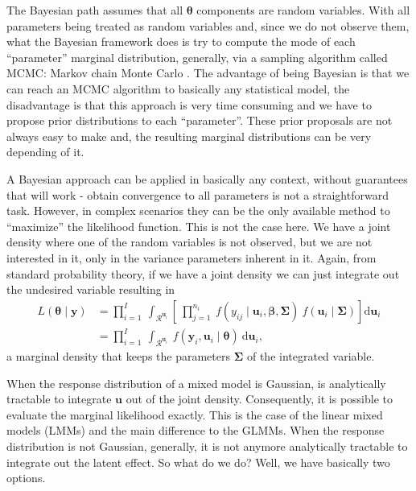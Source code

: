The Bayesian path assumes that all \(\bm{\theta}\) components are random
variables. With all parameters being treated as random variables and,
since we do not observe them, what the Bayesian framework does is try to
compute the mode of each ``parameter'' marginal distribution, generally,
via a sampling algorithm called MCMC: Markov chain Monte Carlo
\cite{MCMC, Diaconis}. The advantage of being Bayesian is that we can
reach an MCMC algorithm to basically any statistical model, the
disadvantage is that this approach is very time consuming and we have to
propose prior distributions to each ``parameter''. These prior proposals
are not always easy to make and, the resulting marginal distributions
can be very depending of it.

A Bayesian approach can be applied in basically any context, without
guarantees that will work - obtain convergence to all parameters is not
a straightforward task. However, in complex scenarios they can be the
only available method to ``maximize'' the likelihood function. This is
not the case here. We have a joint density where one of the random
variables is not observed, but we are not interested in it, only in the
variance parameters inherent in it. Again, from standard probability
theory, if we have a joint density we can just integrate out the
undesired variable resulting in
\begin{equation}
  \begin{aligned}
    L(\bm{\theta} \mid \mathbf{y}) &=
    \prod_{i=1}^{I}~\int_{\mathcal{R}^{\mathbf{u}_{i}}}
    \left[
      ~\prod_{j=1}^{n_{i}}~
      f(y_{ij} \mid \mathbf{u}_{i}, \bm{\beta}, \bm{\Sigma})~
      f(\mathbf{u}_{i} \mid \bm{\Sigma})
    \right]\text{d} \mathbf{u}_{i}\\
    &= \prod_{i=1}^{I}~\int_{\mathcal{R}^{\mathbf{u}_{i}}}~
    f(\mathbf{y}_{i}, \mathbf{u}_{i} \mid \bm{\theta})~
    \text{d} \mathbf{u}_{i},
    \label{eq:generalmarginal}
  \end{aligned}
\end{equation}
a marginal density that keeps the parameters \(\bm{\Sigma}\) of the
integrated variable.

When the response distribution of a mixed model is Gaussian, is
analytically tractable to integrate \(\mathbf{u}\) out of the joint
density. Consequently, it is possible to evaluate the marginal
likelihood exactly. This is the case of the linear mixed models (LMMs)
and the main difference to the GLMMs. When the response distribution is
not Gaussian, generally, it is not anymore analytically tractable to
integrate out the latent effect. So what do we do? Well, we have
basically two options.

